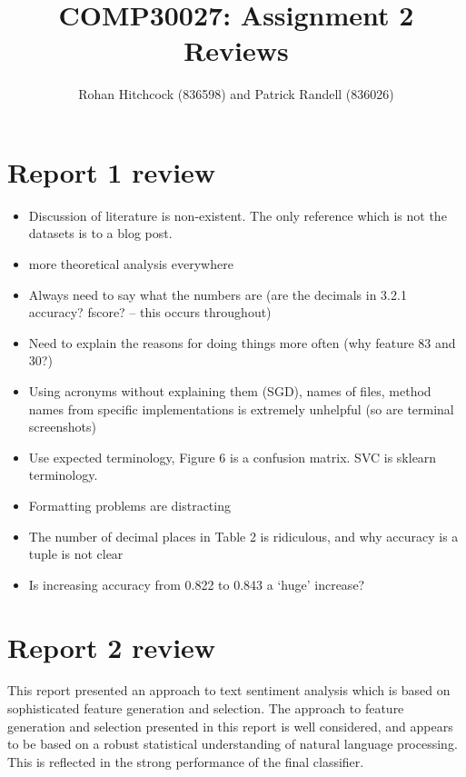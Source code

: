 \documentclass[11pt]{article}
\begin{document}
\title{\textbf{COMP30027: Assignment 2 Reviews}}
\author{Rohan Hitchcock (836598) and Patrick Randell (836026)}
\date{}
\maketitle

\section*{Report 1 review}

\begin{itemize}
    \item Discussion of literature is non-existent. The only reference which is not the datasets is to a blog post.
    \item more theoretical analysis everywhere 
    \item Always need to say what the numbers are (are the decimals in 3.2.1 accuracy? fscore? -- this occurs throughout)
    \item Need to explain the reasons for doing things more often (why feature 83 and 30?) 
    \item Using acronyms without explaining them (SGD), names of files, method names from specific implementations is extremely unhelpful (so are terminal screenshots)
    \item Use expected terminology, Figure 6 is a confusion matrix. SVC is sklearn terminology.
    \item Formatting problems are distracting 
    \item The number of decimal places in Table 2 is ridiculous, and why accuracy is a tuple is not clear
    \item Is increasing accuracy from 0.822 to 0.843 a `huge' increase?
\end{itemize}

\section*{Report 2 review}
This report presented an approach to text sentiment analysis which is based on sophisticated feature generation and selection. The approach to feature generation and selection presented in this report is well considered, and appears to be based on a robust statistical understanding of natural language processing. This is reflected in the strong performance of the final classifier. 
\end{document}
